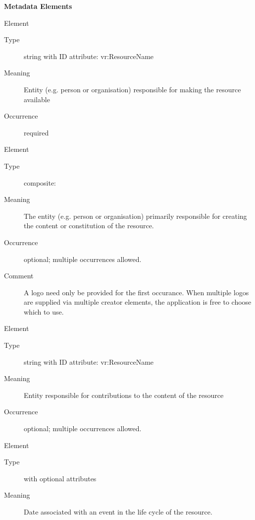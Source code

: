 \documentclass[11pt,a4paper]{ivoa}
\begin{document}
\vspace{0.5ex}\noindent\textbf{ Metadata Elements}

\begingroup\small\begin{bigdescription}\item[Element \xmlel{publisher}]
\begin{description}
\item[Type] string with ID attribute: vr:ResourceName
\item[Meaning] 
               Entity (e.g. person or organisation) responsible for making the 
               resource available
             
\item[Occurrence] required

\end{description}
\item[Element \xmlel{creator}]
\begin{description}
\item[Type] composite: 
\item[Meaning] 
                The entity (e.g. person or organisation) primarily responsible 
                for creating the content or constitution of the resource.
             
\item[Occurrence] optional; multiple occurrences allowed.
\item[Comment] 
                A logo need only be provided for the first occurance.
                When multiple logos are supplied via multiple creator 
                elements, the application is free to choose which to
                use. 
             

\end{description}
\item[Element \xmlel{contributor}]
\begin{description}
\item[Type] string with ID attribute: vr:ResourceName
\item[Meaning] 
               Entity responsible for contributions to the content of
               the resource
             
\item[Occurrence] optional; multiple occurrences allowed.

\end{description}
\item[Element \xmlel{date}]
\begin{description}
\item[Type]  with optional attributes
\item[Meaning] 
               Date associated with an event in the life cycle of the
               resource.  
             

\end{description}
\end{bigdescription}
\end{document}
